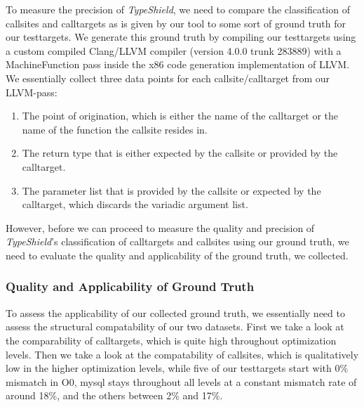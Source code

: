 To measure the precision of \textit{TypeShield}, we need to compare the classification of callsites and calltargets as is given by our tool to some sort of ground truth for our testtargets. We generate this ground truth by compiling our testtargets using a custom compiled Clang/LLVM compiler (version 4.0.0 trunk 283889) with a MachineFunction pass inside the x86 code generation implementation of LLVM. We essentially collect three data points for each callsite/calltarget from our LLVM-pass:
\begin{enumerate}
\item The point of origination, which is either the name of the calltarget or the name of the function the callsite resides in.
\item The return type that is either expected by the callsite or provided by the calltarget.
\item The parameter list that is provided by the callsite or expected by the calltarget, which discards the variadic argument list.
\end{enumerate}
However, before we can proceed to measure the quality and precision of \textit{TypeShield}'s classification of calltargets and callsites using our ground truth, we need to evaluate the quality and applicability of the ground truth, we collected.

\subsubsection{Quality and Applicability of Ground Truth}
\label{subsection:typeshieldprecision}
To assess the applicability of our collected ground truth, we essentially need to assess the structural compatability of our two datasets. First we take a look at the comparability of calltargets, which is quite high throughout optimization levels. Then we take a look at the compatability of callsites, which is qualitatively low in the higher optimization levels, while five of our testtargets start with 0\% mismatch in O0, mysql stays throughout all levels at a constant mismatch rate of around 18\%, and the others between 2\% and 17\%.

